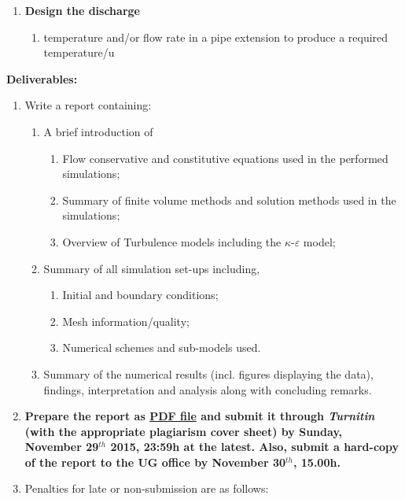 \documentclass[12pts,a4paper,amsmath,amssymb,floatfix]{article}%
\renewcommand\epsilon{\varepsilon}
\begin{document}
\begin{enumerate}[label=\bfseries Problem \arabic*:]
\begin{enumerate}[label=\bfseries Task \arabic*]
\item\label{Practical1:Task3} {\bf Design the discharge}
   \begin{enumerate}
      \item temperature and/or flow rate in a  pipe extension to produce a required temperature/u
   \end{enumerate}

\end{enumerate}

\end{enumerate}
\clearpage

{\bf Deliverables:}
\begin{enumerate}
  \item Write a report containing:
  \begin{enumerate} 
    \item A brief introduction of
       \begin{enumerate}%
          \item Flow conservative and constitutive equations used in the performed simulations;
          \item Summary of finite volume methods and solution methods used in the simulations;
          \item Overview of Turbulence models including the $\kappa$-$\epsilon$ model;    
       \end{enumerate}
    \item Summary of all simulation set-ups including,
       \begin{enumerate}%
          \item Initial and boundary conditions;
          \item Mesh information/quality;
          \item Numerical schemes and sub-models used.
       \end{enumerate}
    \item Summary of the numerical results (incl. figures displaying the data), findings, interpretation and analysis along with concluding remarks.
  \end{enumerate}
%
\item {\bf Prepare the report as \underline{PDF file} and submit it through {\it Turnitin} (with the appropriate plagiarism cover sheet) by Sunday, November 29$^{th}$ 2015, 23:59h at the latest. Also, submit a hard-copy of the report to the UG office by November 30$^{th}$, 15.00h.}
%
%
\item Penalties for late or non-submission are as follows:

\end{enumerate}
\end{document}
